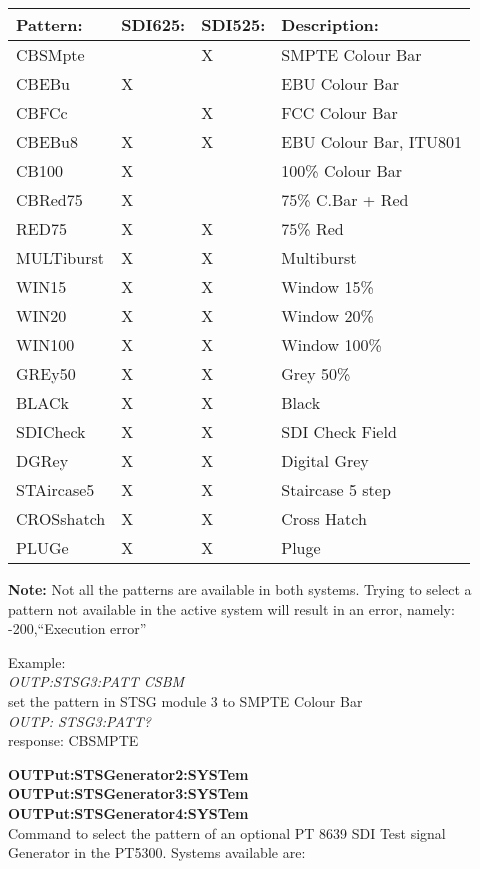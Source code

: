 \begin{tabular}{|l|l|l|l|}
\hline
\textbf{Pattern:}	& \textbf{SDI625:}	& \textbf{SDI525:}	& \textbf{Description:} \\ \hline
CBSMpte						& 	& X	& SMPTE Colour Bar\\ \hline
CBEBu							& X &		& EBU Colour Bar\\ \hline
CBFCc							& 	& X & FCC Colour Bar\\ \hline
CBEBu8						& X & X	& EBU Colour Bar, ITU801\\ \hline
CB100							& X &		& 100\% Colour Bar\\ \hline
CBRed75						& X & 	& 75\% C.Bar + Red\\ \hline
RED75							& X & X	& 75\% Red\\ \hline
MULTiburst				& X & X	& Multiburst\\ \hline
WIN15							& X & X	& Window 15\%\\ \hline
WIN20							& X & X & Window 20\%\\ \hline
WIN100						& X & X & Window 100\%\\ \hline
GREy50						& X & X & Grey 50\%\\ \hline
BLACk							& X & X & Black\\ \hline
SDICheck					& X & X & SDI Check Field\\ \hline
DGRey							& X & X & Digital Grey\\ \hline
STAircase5				& X & X & Staircase 5 step\\ \hline
CROSshatch				& X & X & Cross Hatch\\ \hline
PLUGe							& X & X & Pluge\\ \hline
\end{tabular}

\textbf{Note:} Not all the patterns are available in both systems. Trying to select a pattern not available in the active system will result in an error, namely: -200,``Execution error''

Example:\\
\textit{OUTP:STSG3:PATT CSBM}\\
set the pattern in STSG module 3 to SMPTE Colour Bar\\
\textit{OUTP: STSG3:PATT?}\\
response: CBSMPTE

\textbf{OUTPut:STSGenerator2:SYSTem}\\
\textbf{OUTPut:STSGenerator3:SYSTem}\\
\textbf{OUTPut:STSGenerator4:SYSTem}\\
Command to select the pattern of an optional PT 8639 SDI Test signal Generator in the PT5300. Systems available are:

